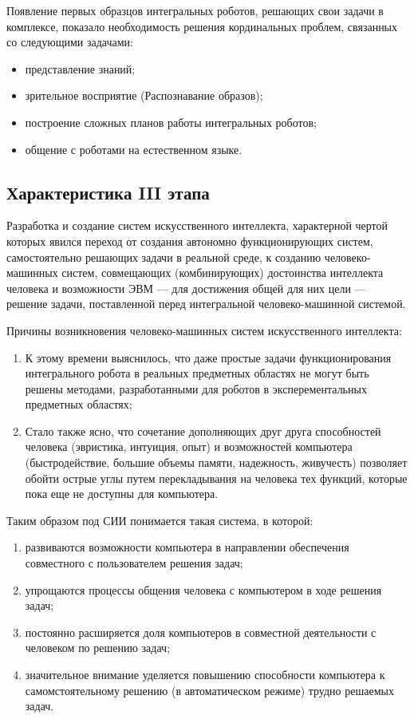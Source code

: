 \documentclass[a4paper,12pt]{report}
\begin{document}
	Появление первых образцов интегральных роботов, решающих свои задачи в
	комплексе, показало необходимость решения кординальных проблем,
	связанных со следующими задачами:
	\begin{itemize}
		\item представление знаний;
		\item зрительное восприятие (Распознавание образов);
		\item построение сложных планов работы интегральных роботов;
		\item общение с роботами на естественном языке.
	\end{itemize}


\subsection{Характеристика III этапа}
	Разработка и создание систем искусственного интеллекта,
	характерной чертой которых явился переход от создания автономно
	функционирующих систем, самостоятельно решающих задачи в реальной среде,
	к созданию человеко-машинных систем, совмещающих (комбинирующих) достоинства
	интеллекта человека и возможности ЭВМ — для достижения общей для них цели —
	решение задачи, поставленной перед интегральной человеко-машинной
	системой.\par

	Причины возникновения человеко-машинных систем искусственного интеллекта:

	\begin{enumerate}
		\item К этому времени выяснилось, что даже простые задачи функционирования
			интегрального робота в реальных предметных областях не могут быть решены
			методами, разработанными для роботов в эксперементальных
			предметных областях;
		\item Стало также ясно, что сочетание дополняющих друг друга способностей
			человека (эвристика, интуиция, опыт) и возможностей компьютера
			(быстродействие, большие объемы памяти, надежность, живучесть) позволяет
			обойти острые углы путем перекладывания на человека тех функций,
			которые пока еще не доступны для компьютера. \\
	\end{enumerate}

	Таким образом под СИИ понимается такая система, в которой:
	\begin{enumerate}
		\item развиваются возможности компьютера в направлении обеспечения
			совместного с пользователем решения задач;
		\item упрощаются процессы общения человека с компьютером в ходе решения
			задач;
		\item постоянно расширяется доля компьютеров в совместной деятельности
			с человеком по решению задач;
		\item значительное внимание уделяется повышению способности компьютера
			к самомстоятельному решению (в автоматическом режиме) трудно решаемых
			задач.
	\end{enumerate}
\end{document}
